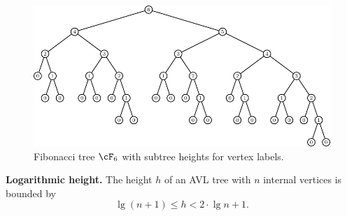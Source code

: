 \begin{figure}[!htbp]
\centering
{}
\includegraphics{image/tree-data-structures/Fibonacci-tree-height}
\caption{Fibonacci tree $\cF_6$ with subtree heights for vertex labels.}
\label{fig:tree_data_structures:Fibonacci_tree_F6_subtree_heights}
\end{figure}

\begin{theorem}
\label{thm:tree_data_structures:AVL_tree_logarithmic_height}
\textbf{Logarithmic height.}
The height $h$ of an AVL tree with $n$ internal vertices is bounded by
\[
\lg(n + 1) \leq h < 2 \cdot \lg n + 1.
\]
\end{theorem}

